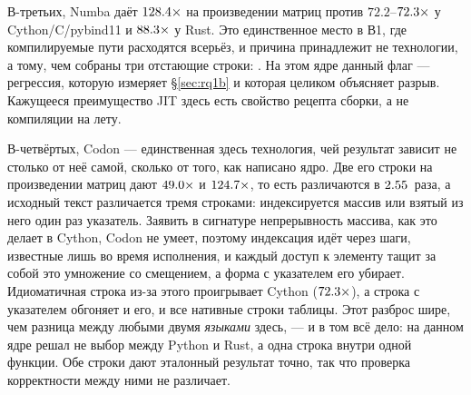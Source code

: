 В-третьих, Numba даёт $\meas{ratio:b1_compute-314:matmul/cpython_loop|b1_compute-314:matmul/numba}{128.4}\times$ на произведении матриц против $72.2$--$\meas{ratio:b1_compute-314:matmul/cpython_loop|b1_compute-314:matmul/cython}{72.3}\times$ у
Cython/C/pybind11 и $\meas{ratio:b1_compute-314:matmul/cpython_loop|b1_compute-314:matmul/rust_ctypes}{88.3}\times$ у Rust. Это единственное место в В1, где компилируемые пути
расходятся всерьёз, и причина принадлежит не технологии, а тому, чем собраны три отстающие
строки: . На этом ядре данный флаг --- регрессия, которую измеряет
\S\ref{sec:rq1b} и которая целиком объясняет разрыв. Кажущееся преимущество JIT здесь есть
свойство рецепта сборки, а не компиляции на лету.

В-четвёртых, Codon --- единственная здесь технология, чей результат зависит не столько от неё
самой, сколько от того, как написано ядро. Две его строки на произведении матриц дают
$\meas{ratio:b1_compute-314:matmul/cpython_loop|b1_compute-314:matmul/codon_pyext}{49.0}\times$ и $\meas{ratio:b1_compute-314:matmul/cpython_loop|b1_compute-314:matmul/codon_pyext_ptr}{124.7}\times$, то есть различаются в $\meas{ratio:b1_compute-314:matmul/codon_pyext|b1_compute-314:matmul/codon_pyext_ptr}{2.55}$~раза, а исходный текст различается
тремя строками: индексируется массив или взятый из него один раз указатель. Заявить в
сигнатуре непрерывность массива, как это делает  в Cython, Codon не умеет,
поэтому индексация  идёт через шаги, известные лишь во время исполнения, и каждый
доступ к элементу тащит за собой это умножение со смещением, а форма с указателем его убирает. Идиоматичная строка из-за этого проигрывает Cython
($\meas{ratio:b1_compute-314:matmul/cpython_loop|b1_compute-314:matmul/cython}{72.3}\times$), а строка с указателем обгоняет и его, и все нативные строки таблицы. Этот
разброс шире, чем разница между любыми двумя \emph{языками} здесь, --- и в том всё дело: на
данном ядре решал не выбор между Python и Rust, а одна строка внутри одной функции. Обе строки
дают эталонный результат точно, так что проверка корректности между ними не различает.

